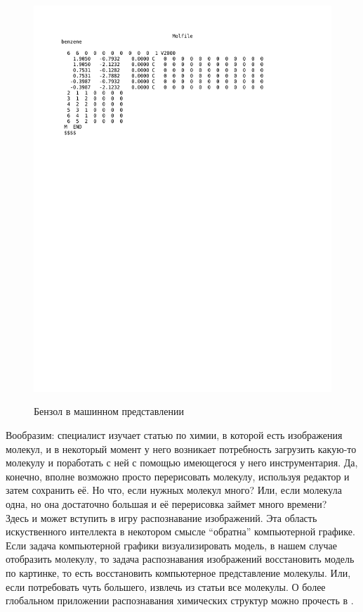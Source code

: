 \begin{figure}[h]
{\includegraphics[scale=0.6, clip, trim = 10mm 180mm 45mm 10mm]{img/benzene_molfile.pdf}}
\caption{Бензол в машинном представлении}
\end{figure}

\noindent Вообразим: специалист изучает статью по химии, в которой есть изображения молекул, и в некоторый момент у него возникает 
потребность загрузить какую-то молекулу и поработать с ней с помощью имеющегося у него инструментария. Да, конечно,
вполне возможно просто перерисовать молекулу, используя редактор и затем сохранить её. Но что, если нужных молекул много? 
Или, если молекула одна, но она достаточно большая и её перерисовка займет много времени? \\ 

\noindent 
Здесь и может вступить в игру распознавание изображений. Эта область искуственного интеллекта в некотором смысле ``обратна'' 
компьютерной графике. Если задача компьютерной графики визуализировать модель, в нашем случае отобразить молекулу, то задача 
распознавания изображений восстановить модель по картинке, то есть восстановить компьютерное представление молекулы. Или, 
если потребовать чуть большего, извлечь из статьи все молекулы. О более глобальном приложении распознавания химических структур 
можно прочесть в \cite{pavlov}.\\

